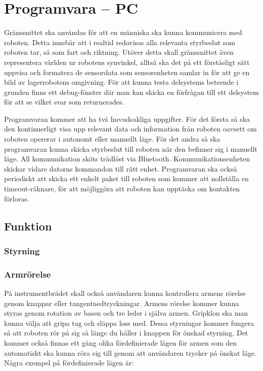 

\section{Programvara – PC}

Gränssnittet ska användas för att en människa ska kunna kommunicera med roboten. Detta innebär att i realtid redovisas alla relevanta styrbeslut som roboten tar, så som fart och riktning. Utöver detta skall gränssnittet även representera världen ur robotens synvinkel, alltså ska det på ett förståeligt sätt uppvisa och formatera de sensordata som sensorenheten samlar in för att ge en bild av lagerrobotens omgivning. För att kunna testa delsystems beteende i grunden finns ett debug-fönster där man kan skicka en förfrågan till ett delsystem för att se vilket svar som returnerades.




Programvaran kommer att ha två huvudsakliga uppgifter. För det första så ska den kontinuerligt visa upp relevant data och information från roboten oavsett om roboten opererar i autonomt eller manuellt läge. För det andra så ska programvaran kunna skicka styrbeslut till roboten när den befinner sig i manuellt läge. All kommunikation sköts trådlöst via Bluetooth. Kommunikationsenheten skickar vidare datorns kommandon till rätt enhet. Programvaran ska också periodiskt att skicka ett enkelt paket till roboten som kommer att nollställa en timeout-räknare, för att möjliggöra att roboten kan upptäcka om kontakten förloras.

\subsection{Funktion}

\subsubsection{Styrning}

\subsubsection{Armrörelse}

På instrumentbrädet skall också användaren kunna kontrollera armens rörelse genom knappar eller tangentnedtryckningar. Armens rörelse kommer kunna styras genom rotation av basen och tre leder i själva armen. Gripklon ska man kunna välja att gripa tag och släppa loss med. Dessa styrningar kommer fungera så att roboten rör på sig så länge du håller i knappen för önskad styrning. Det kommer också finnas ett gäng olika fördefinierade lägen för armen som den automatiskt ska kunna röra sig till genom att användaren trycker på önskat läge. Några exempel på fördefinierade lägen är:


